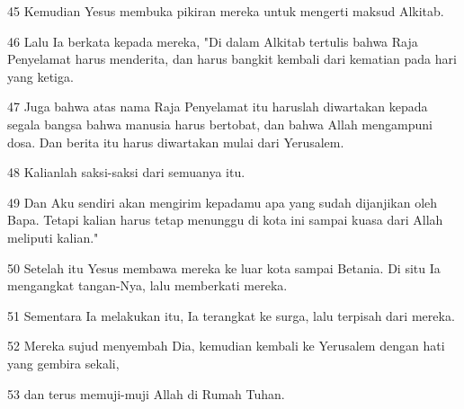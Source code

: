\par 45 Kemudian Yesus membuka pikiran mereka untuk mengerti maksud Alkitab.
\par 46 Lalu Ia berkata kepada mereka, "Di dalam Alkitab tertulis bahwa Raja Penyelamat harus menderita, dan harus bangkit kembali dari kematian pada hari yang ketiga.
\par 47 Juga bahwa atas nama Raja Penyelamat itu haruslah diwartakan kepada segala bangsa bahwa manusia harus bertobat, dan bahwa Allah mengampuni dosa. Dan berita itu harus diwartakan mulai dari Yerusalem.
\par 48 Kalianlah saksi-saksi dari semuanya itu.
\par 49 Dan Aku sendiri akan mengirim kepadamu apa yang sudah dijanjikan oleh Bapa. Tetapi kalian harus tetap menunggu di kota ini sampai kuasa dari Allah meliputi kalian."
\par 50 Setelah itu Yesus membawa mereka ke luar kota sampai Betania. Di situ Ia mengangkat tangan-Nya, lalu memberkati mereka.
\par 51 Sementara Ia melakukan itu, Ia terangkat ke surga, lalu terpisah dari mereka.
\par 52 Mereka sujud menyembah Dia, kemudian kembali ke Yerusalem dengan hati yang gembira sekali,
\par 53 dan terus memuji-muji Allah di Rumah Tuhan.



